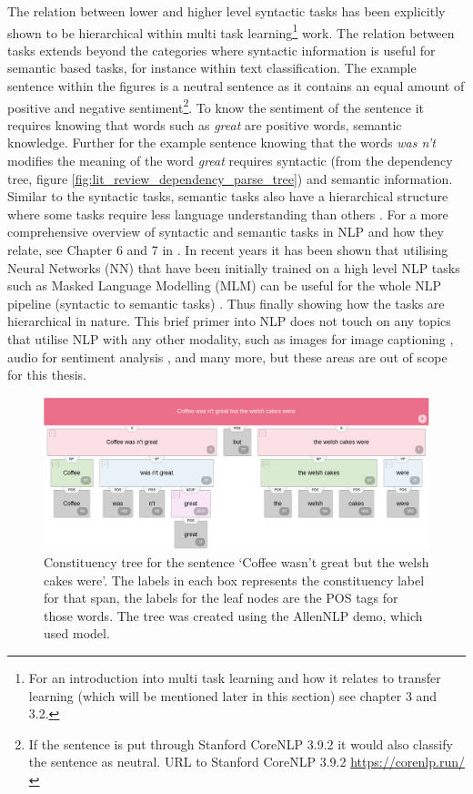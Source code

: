 The relation between lower and higher level syntactic tasks has been explicitly shown to be hierarchical within \citet{sogaard-goldberg-2016-deep} multi task learning\footnote{For an introduction into multi task learning and how it relates to transfer learning (which will be mentioned later in this section) see \citep{ruder2019neural} chapter 3 and 3.2.} work. The relation between tasks extends beyond the categories where syntactic information is useful for semantic based tasks, for instance within text classification. The example sentence within the figures is a neutral sentence as it contains an equal amount of positive and negative sentiment\footnote{If the sentence is put through Stanford CoreNLP 3.9.2 it would also classify the sentence as neutral. URL to Stanford CoreNLP 3.9.2 \url{https://corenlp.run/}}. To know the sentiment of the sentence it requires knowing that words such as \textit{great} are positive words, semantic knowledge. Further for the example sentence knowing that the words \textit{was n't} modifies the meaning of the word \textit{great} requires syntactic (from the dependency tree, figure \ref{fig:lit_review_dependency_parse_tree}) and semantic information. Similar to the syntactic tasks, semantic tasks also have a hierarchical structure where some tasks require less language understanding than others \citet{sanh2019hierarchical}. For a more comprehensive overview of syntactic and semantic tasks in NLP and how they relate, see Chapter 6 and 7 in \citet{goldberg2017neural}. In recent years it has been shown that utilising Neural Networks (NN) that have been initially trained on a high level NLP tasks such as Masked Language Modelling (MLM) \citep{devlin-etal-2019-bert} can be useful for the whole NLP pipeline (syntactic to semantic tasks) \citep{tenney-etal-2019-bert}. Thus finally showing how the tasks are hierarchical in nature. This brief primer into NLP does not touch on any topics that utilise NLP with any other modality, such as images for image captioning \citep{Karpathy_2015_CVPR}, audio for sentiment analysis \citep{raaijmakers-etal-2008-multimodal}, and many more, but these areas are out of scope for this thesis.

\begin{figure}[!h]
    \centering
    \includegraphics[scale=0.28]{images/lit_review/constituency_tree.png}
    \caption{Constituency tree for the sentence `Coffee wasn't great but the welsh cakes were'. The labels in each box represents the constituency label for that span, the labels for the leaf nodes are the POS tags for those words. The tree was created using the AllenNLP demo, which used \citet{joshi-etal-2018-extending} model.}
    \label{fig:lit_review_constituency_tree}
\end{figure}

